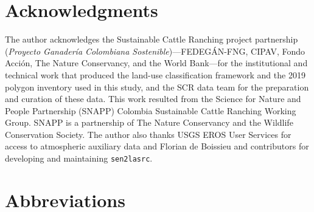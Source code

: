\documentclass[
  authoryear,
  preprint]{elsarticle}
\begin{document}
\section*{Acknowledgments}\label{acknowledgments}

The author acknowledges the Sustainable Cattle Ranching project
partnership (\emph{Proyecto Ganadería Colombiana
Sostenible})---FEDEGÁN-FNG, CIPAV, Fondo Acción, The Nature Conservancy,
and the World Bank---for the institutional and technical work that
produced the land-use classification framework and the 2019 polygon
inventory used in this study, and the SCR data team for the preparation
and curation of these data. This work resulted from the Science for
Nature and People Partnership (SNAPP) Colombia Sustainable Cattle
Ranching Working Group. SNAPP is a partnership of The Nature Conservancy
and the Wildlife Conservation Society. The author also thanks USGS EROS
User Services for access to atmospheric auxiliary data and Florian de
Boissieu and contributors for developing and maintaining
\texttt{sen2lasrc}.

\section*{Abbreviations}\label{abbreviations}
\end{document}
